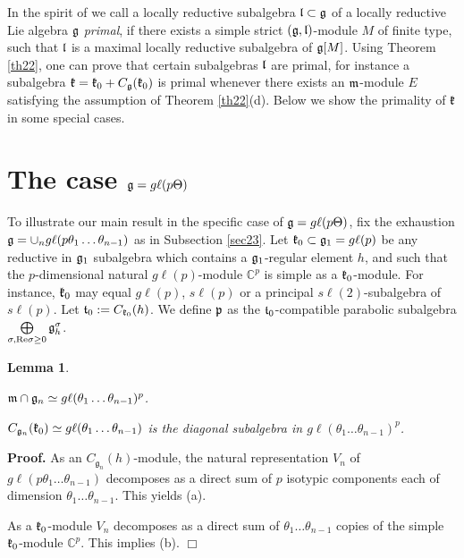 \documentclass[12pt]{article}
\newcounter{theorem}
\newtheorem{lemma}[theo]{Lemma}
\newenvironment{proof}{ \textbf{Proof.}}{$\Box$}
\newcommand {\CC} {\mathbb {C}}
\renewcommand{\gg}{\mathfrak{g}}
\newcommand{\refth}[1]{Theorem \ref{#1}}
\newcommand{\gl}{{g\ell}}
\begin{document}
In the spirit of \cite{PSZ} we call a locally reductive subalgebra $\frak{l}\subset\frak g$ of a locally reductive Lie algebra $\frak g$ {\it primal}, if there exists a simple strict $(\frak g,\frak l)$-module $M$ of finite type, such that $\frak l$ is a maximal locally reductive subalgebra of $\frak g [M]$.  Using \refth{th22}, one can prove that certain subalgebras $\frak{l}$ are primal, for instance a subalgebra $\frak k = \frak k_0 + C_{\frak g} (\frak k_0)$ is primal whenever there exists an $\frak m$-module $E$ satisfying the assumption of \refth{th22}(d). Below we show the primality of $\frak k$ in some special cases.

\section{The case $\frak g = \gl (p\Theta)$}
To illustrate our main result in the specific case of $\frak g = \gl (p\Theta)$, fix the exhaustion $\frak g = \cup_n \gl (p\theta_1\ldots\theta_{n-1})$ as in Subsection \ref{sec23}.  Let $\frak k_0\subset\frak g_1 = \gl (p)$ be any reductive in $\frak g_1$ subalgebra which contains a $\frak g_1$-regular element $h$, and such that the $p$-dimensional natural $\gl (p)$-module $\CC^p$ is simple as a $\frak k_0$-module.  For instance, $\frak k_0$ may equal $\gl (p)$, $s\ell (p)$ or a principal $s\ell (2)$-subalgebra of $s\ell (p)$. Let $\frak t_0 := {C}_{\frak k_{0}} (h)$. We define $\frak p$ as the $\frak t_0$-compatible parabolic subalgebra $\bigoplus\limits_{\sigma ,\text{Re} \sigma\geq 0} \frak g^\sigma_h$.

\begin{lemma}\label{le31}
\item[(a)] $\frak m\cap\frak g_n\simeq \gl(\theta_1\ldots\theta_{n-1})^p$.

\item[(b)] $C_{\frak g_{n}} (\frak k_0)\simeq \gl (\theta_1\ldots\theta_{n-1})$ is the diagonal subalgebra in $\gl (\theta_1\ldots\theta_{n-1})^p$.
\end{lemma}

\begin{proof} As an $C_{\gg_n}(h)$-module, the natural representation $V_n$ of $\gl (p\theta_1\ldots\theta_{n-1})$ decomposes as a direct sum of $p$ isotypic components each of dimension $\theta_1\ldots\theta_{n-1}$.  This yields (a).

As a $\frak k_0$-module $V_n$ decomposes as a direct sum of $\theta_1\ldots\theta_{n-1}$ copies of the simple $\frak k_0$-module $\CC^p$.  This implies (b).
\end{proof}
\end{document}

